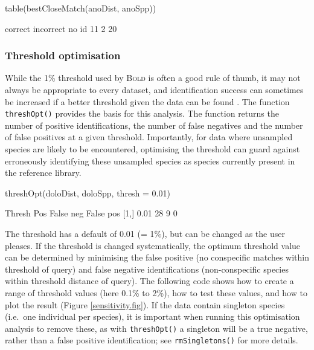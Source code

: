 \documentclass{article}
\newcommand{\progname}[1]{\textsc{#1}}
\newcommand{\fun}[1]{\texttt{#1}}
\begin{document}
\begin{console}
table(bestCloseMatch(anoDist, anoSpp))
\end{console}

\begin{Routput}
  correct incorrect     no id 
       11         2        20 
\end{Routput}

\subsubsection{Threshold optimisation} %
While the 1\% threshold used by \progname{Bold} is often a good rule of thumb, it may not always be appropriate to every dataset, and identification success can sometimes be increased if a better threshold given the data can be found  \citep{Meye.Paul.2005}.  The function \fun{threshOpt()} provides the basis for this analysis. The function returns the number of positive identifications, the number of false negatives and the number of false positives at a given threshold. Importantly, for data where unsampled species are likely to be encountered, optimising the threshold can guard against erroneously identifying these unsampled species as species currently present in the reference library.

\begin{console}
threshOpt(doloDist, doloSpp, thresh = 0.01)
\end{console}

\begin{Routput}
     Thresh Pos False neg False pos
[1,]   0.01  28         9         0
\end{Routput}

The threshold has a default of 0.01 (= 1\%), but can be changed as the user pleases. If the threshold is changed systematically, the optimum threshold value can be determined by minimising the false positive (no conspecific matches within threshold of query) and false negative identifications (non-conspecific species within threshold distance of query). The following code shows how to create a range of threshold values (here 0.1\% to 2\%), how to test these values, and how to plot the result (Figure \ref{sensitivity.fig}). If the data contain singleton species (i.e.\ one individual per species), it is important when running this optimisation analysis to remove these, as with \fun{threshOpt()} a singleton will be a true negative, rather than a false positive identification; see \fun{rmSingletons()} for more details.
\end{document}
